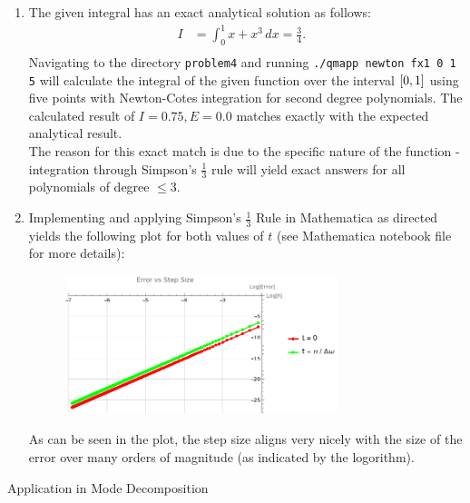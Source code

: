 \documentclass[12pt]{article}
\newenvironment{ex}[2][Exercise]{\begin{trivlist}
\item[\hskip \labelsep {\bfseries #1}\hskip \labelsep {\bfseries #2.}]}{\end{trivlist}}
\newenvironment{sol}[1][Solution]{\begin{trivlist}
\item[\hskip \labelsep {\bfseries #1:}]}{\end{trivlist}}
\DeclarePairedDelimiter\sqrb{[}{]}
\begin{document}
\begin{sol}  \end{sol}

\begin{enumerate}[label=(\alph*)]
    \item The given integral has an exact analytical solution as follows: 
        \begin{align*}
            I & =  \int_{0}^{1} {x + x^{3}} \,d x = \frac{3}{4} .&\\
        \end{align*}
        Navigating to the directory \texttt{problem4} and running \texttt{./qmapp newton fx1 0 1 5} will calculate the integral of the given function over the interval \(\sqrb*{0,1}\) using five points with Newton-Cotes integration for second degree polynomials. The calculated result of \(I = 0.75, E = 0.0\) matches exactly with the expected analytical result. \\ 
        The reason for this exact match is due to the specific nature of the function - integration through Simpson's \(\frac{1}{3} \) rule will yield exact answers for all polynomials of degree \(\leq 3\).
   \item Implementing and applying Simpson's \(\frac{1}{3}\) Rule in Mathematica as directed yields the following plot for both values of \(t\) (see Mathematica notebook file for more details):
             \begin{figure}[ht]
            \centering
            \includegraphics[width=0.75\textwidth]{./../problem4/prob4a.png}
            \caption{}
            \label{fig:graph4a}
        \end{figure}
        As can be seen in the plot, the step size aligns very nicely with the size of the error over many orders of magnitude (as indicated by the logorithm).
\end{enumerate}

\newpage

\begin{ex}
    5 Application in Mode Decomposition
\end{ex}
\end{document}

